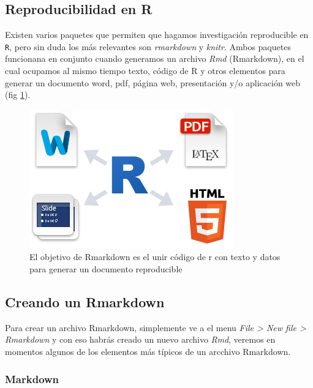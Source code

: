 \documentclass[]{book}
\begin{document}
\hypertarget{reproducibilidad-en-r}{%
\subsection{Reproducibilidad en R}\label{reproducibilidad-en-r}}

Existen varios paquetes que permiten que hagamos investigación
reproducible en \texttt{R}, pero sin duda los más relevantes son
\emph{rmarkdown} y \emph{knitr}. Ambos paquetes funcionana en conjunto
cuando generamos un archivo \emph{Rmd} (Rmarkdown), en el cual ocupamos
al mismo tiempo texto, código de R y otros elementos para generar un
documento word, pdf, página web, presentación y/o aplicación web (fig
\ref{fig:Rmark}).

\begin{figure}

{\centering \includegraphics[width=0.8\linewidth]{Rmark} 

}

\caption{El objetivo de Rmarkdown es el unir código de r con texto y datos para generar un documento reproducible}\label{fig:Rmark}
\end{figure}

\hypertarget{creando-un-rmarkdown}{%
\subsection{Creando un Rmarkdown}\label{creando-un-rmarkdown}}

Para crear un archivo Rmarkdown, simplemente ve a el menu \emph{File
\textgreater{} New file \textgreater{} Rmarkdown} y con eso habrás
creado un nuevo archivo \emph{Rmd}, veremos en momentos algunos de los
elementos más típicos de un arcchivo Rmarkdown.

\hypertarget{markdown}{%
\subsubsection{Markdown}\label{markdown}}
\end{document}
